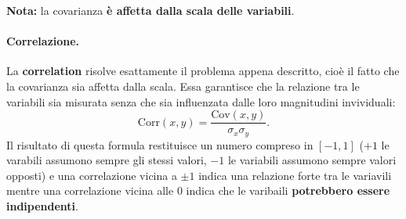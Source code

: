 \textbf{Nota:} la covarianza \textbf{è affetta dalla scala delle variabili}.



\paragraph{Correlazione.} La \textbf{correlation} risolve esattamente il problema appena descritto, cioè il fatto che la covarianza sia affetta dalla scala. Essa garantisce che la relazione tra le variabili sia misurata senza che sia influenzata dalle loro magnitudini invividuali:
\begin{equation}
    \text{Corr}(x,y)=\frac{\text{Cov}(x,y)}{\sigma_x\sigma_y}.
\end{equation}
Il risultato di questa formula restituisce un numero compreso in $[-1,1]$ ($+1$ le varabili assumono sempre gli stessi valori, $-1$ le variabili assumono sempre valori opposti) e una correlazione vicina a $\pm1$ indica una relazione forte tra le variavili mentre una correlazione vicina alle $0$ indica che le varibaili \textbf{potrebbero essere indipendenti}. 


